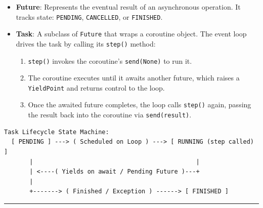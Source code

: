 \begin{itemize}
\tightlist
\item
  \textbf{Future}: Represents the eventual result of an asynchronous
  operation. It tracks state: \passthrough{\lstinline!PENDING!},
  \passthrough{\lstinline!CANCELLED!}, or
  \passthrough{\lstinline!FINISHED!}.
\item
  \textbf{Task}: A subclass of \passthrough{\lstinline!Future!} that
  wraps a coroutine object. The event loop drives the task by calling
  its \passthrough{\lstinline!step()!} method:

  \begin{enumerate}
  \def\labelenumi{\arabic{enumi}.}
  \tightlist
  \item
    \passthrough{\lstinline!step()!} invokes the coroutine's
    \passthrough{\lstinline!send(None)!} to run it.
  \item
    The coroutine executes until it awaits another future, which raises
    a \passthrough{\lstinline!YieldPoint!} and returns control to the
    loop.
  \item
    Once the awaited future completes, the loop calls
    \passthrough{\lstinline!step()!} again, passing the result back into
    the coroutine via \passthrough{\lstinline!send(result)!}.
  \end{enumerate}
\end{itemize}

\begin{lstlisting}
Task Lifecycle State Machine:
  [ PENDING ] ---> ( Scheduled on Loop ) ---> [ RUNNING (step called) ]
       |                                             |
       | <----( Yields on await / Pending Future )---+
       |
       +-------> ( Finished / Exception ) ------> [ FINISHED ]
\end{lstlisting}

\begin{center}\rule{0.5\linewidth}{0.5pt}\end{center}
